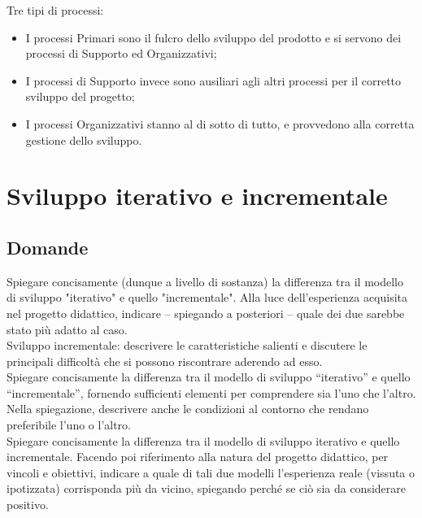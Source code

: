 Tre tipi di processi:
\begin{itemize}
\item I processi Primari sono il fulcro dello sviluppo del prodotto e si servono dei processi di Supporto ed Organizzativi;
\item I processi di Supporto invece sono ausiliari agli altri processi per il corretto sviluppo del progetto;
\item I processi Organizzativi stanno al di sotto di tutto, e provvedono alla corretta gestione dello sviluppo.
\end{itemize}

\section{Sviluppo iterativo e incrementale}

\subsection*{Domande}
Spiegare concisamente (dunque a livello di sostanza) la differenza tra il modello di sviluppo "iterativo" e quello "incrementale". 
Alla luce dell'esperienza acquisita nel progetto didattico, indicare – spiegando a posteriori – quale dei due sarebbe stato più adatto al caso.\\

Sviluppo incrementale: descrivere le caratteristiche salienti e discutere le principali difficoltà che si possono riscontrare aderendo ad esso.\\ 

Spiegare concisamente la differenza tra il modello di sviluppo “iterativo” e quello “incrementale”, fornendo sufficienti elementi per comprendere sia l'uno che l'altro.
Nella spiegazione, descrivere anche le condizioni al contorno che rendano preferibile l'uno o l'altro. \\

Spiegare concisamente la differenza tra il modello di sviluppo iterativo e quello incrementale.
Facendo poi riferimento alla natura del progetto didattico, per vincoli e obiettivi, indicare a quale di tali due modelli l'esperienza reale (vissuta o ipotizzata) corrisponda più da vicino, spiegando perché se ciò sia da considerare positivo. 

